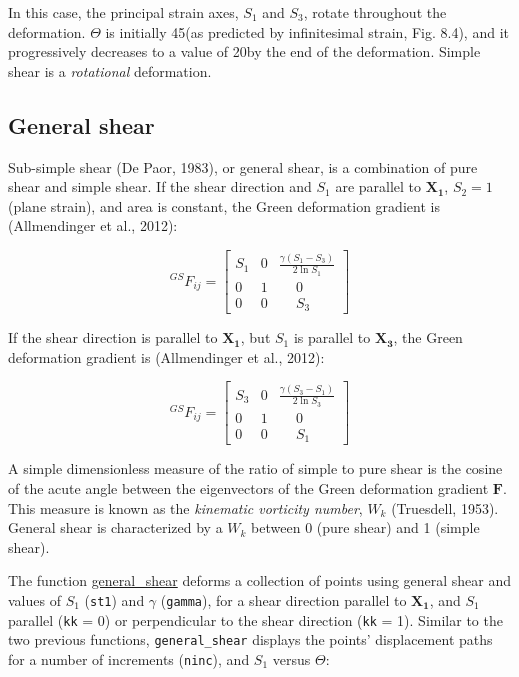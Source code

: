 \documentclass[a4paper , 12pt]{book}
\newcommand{\code}[1]{\colorbox{light-gray}{\texttt{#1}}}
\begin{document}
In this case, the principal strain axes, $S_1$ and $S_3$, rotate throughout the deformation. $\Theta$ is initially 45\degree\space (as predicted by infinitesimal strain, Fig. 8.4), and it progressively decreases to a value of 20\degree\space by the end of the deformation. Simple shear is a \textit{rotational} deformation.

\subsection{General shear}

Sub-simple shear (De Paor, 1983), or general shear, is a combination of pure shear and simple shear. If the shear direction and $S_1$ are parallel to $\mathbf{X_1}$, $S_2 = 1$ (plane strain), and area is constant, the Green deformation gradient is (Allmendinger et al., 2012):

\begin{equation}
    { }^{GS}F_{i j}=\left[\begin{array}{lll}S_1 & 0 & \frac{\gamma(S_1-S_3)}{2\ln S_1} \\ 0 & 1 & \quad\: 0 \\ 0 & 0 &\quad\: S_3\end{array}\right]
\end{equation}

If the shear direction is parallel to $\mathbf{X_1}$, but $S_1$ is parallel to $\mathbf{X_3}$, the Green deformation gradient is (Allmendinger et al., 2012):

\begin{equation}
    { }^{GS}F_{i j}=\left[\begin{array}{lll}S_3 & 0 & \frac{\gamma(S_3-S_1)}{2\ln S_3} \\ 0 & 1 & \quad\: 0 \\ 0 & 0 &\quad\: S_1\end{array}\right]
\end{equation}

A simple dimensionless measure of the ratio of simple to pure shear is the cosine of the acute angle between the eigenvectors of the Green deformation gradient $\mathbf{F}$. This measure is known as the \textit{kinematic vorticity number}, $W_k$ (Truesdell, 1953). General shear is characterized by a $W_k$ between 0 (pure shear) and 1 (simple shear).

The function \href{https://github.com/nfcd/compGeo/blob/master/source/functions/general_shear.py}{general\_shear} deforms a collection of points using general shear and values of $S_1$ (\code{st1}) and $\gamma$ (\code{gamma}), for a shear direction parallel to $\mathbf{X_1}$, and $S_1$ parallel (\code{kk} = 0) or perpendicular to the shear direction (\code{kk} = 1). Similar to the two previous functions, \code{general\_shear} displays the points' displacement paths for a number of increments (\code{ninc}), and $S_1$ versus $\Theta$:
\end{document}
